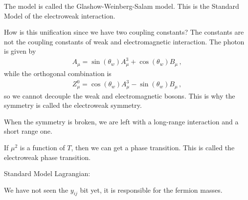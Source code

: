 \documentclass[main.tex]{subfiles}
\begin{document}
The model is called the Glashow-Weinberg-Salam model. This is the Standard Model of the electroweak interaction.

How is this unification since we have two coupling constants? The constants are not the coupling constants of weak and electromagnetic interaction. The photon is given by
%
\begin{align}
A_{\mu } = \sin(\theta_{w}) A^{3}_{\mu } + \cos(\theta_{w}) B_{\mu }
\,,
\end{align}
%
while the orthogonal combination is 
%
\begin{align}
Z^{0}_{\mu } = \cos(\theta_{w}) A^{3}_{\mu } - \sin(\theta_{w}) B_{\mu }
\,,
\end{align}
%
so we cannot decouple the weak and electromagnetic bosons.
This is why the symmetry is called the electroweak symmetry.

When the symmetry is broken, we are left with a long-range interaction and a short range one.

If \(\mu^2\) is a function of \(T\), then we can get a phase transition.
This is called the electroweak phase transition.

Standard Model Lagrangian: 
%

We have not seen the \(y_{ij}\) bit yet, it is responsible for the fermion masses.
\end{document}
